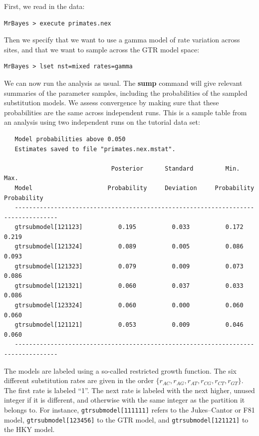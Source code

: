 \documentclass[12pt]{book}
\begin{document}
First, we read in the data:

\begin{verbatim}
MrBayes > execute primates.nex
\end{verbatim}

Then we specify that we want to use a gamma model of rate variation across sites, and that we want to sample
across the GTR model space:

\begin{verbatim}
MrBayes > lset nst=mixed rates=gamma
\end{verbatim}

We can now run the analysis as usual. The \textbf{sump} command will give relevant summaries of the parameter
samples, including the probabilities of the sampled substitution models. We assess convergence by making sure
that these probabilities are the same across independent runs. This is a sample table from an analysis using
two independent runs on the tutorial data set:

\scriptsize
\begin{singlespacing}
\begin{verbatim}
   Model probabilities above 0.050
   Estimates saved to file "primates.nex.mstat".

                              Posterior      Standard         Min.           Max.   
   Model                     Probability     Deviation     Probability    Probability
   ----------------------------------------------------------------------------------
   gtrsubmodel[121123]          0.195          0.033          0.172          0.219
   gtrsubmodel[121324]          0.089          0.005          0.086          0.093
   gtrsubmodel[121323]          0.079          0.009          0.073          0.086
   gtrsubmodel[121321]          0.060          0.037          0.033          0.086
   gtrsubmodel[123324]          0.060          0.000          0.060          0.060
   gtrsubmodel[121121]          0.053          0.009          0.046          0.060
   ----------------------------------------------------------------------------------
\end{verbatim}
\end{singlespacing}
\normalsize

The models are labeled using a so-called restricted growth function. The six different substitution rates are
given in the order $\{r_{AC},r_{AG},r_{AT},r_{CG},r_{CT},r_{GT}\}$. The first rate is labeled ``1''. The 
next rate is labeled with the next higher, unused integer if it is different, and otherwise with the same integer as the
partition it belongs to. For instance, \texttt{gtrsubmodel[111111]} refers to the Jukes--Cantor or F81 model,
\texttt{gtrsubmodel[123456]} to the GTR model, and \texttt{gtrsubmodel[121121]} to the HKY model.
\end{document}
